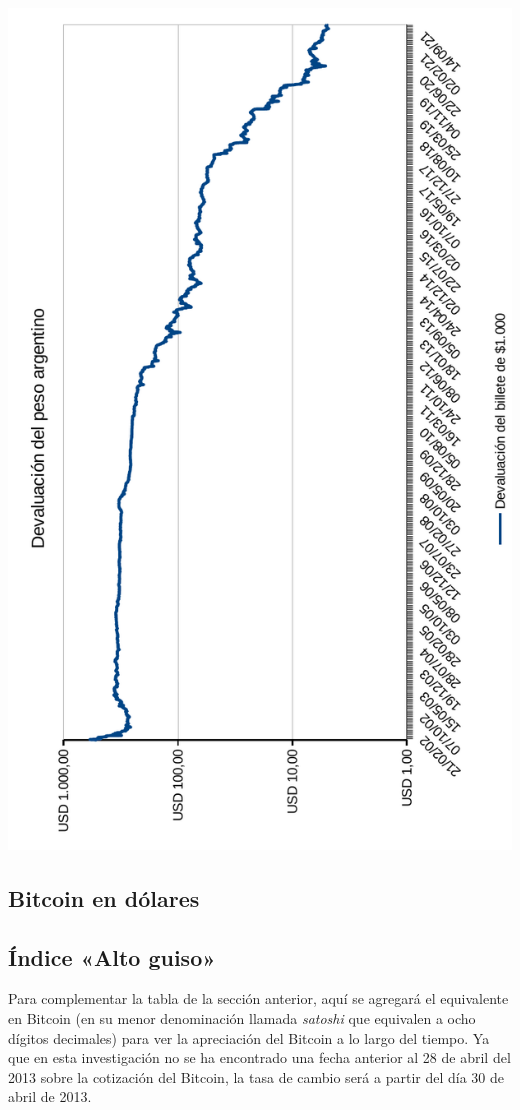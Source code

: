 \documentclass[12pt,a4paper,twoside]{book}
\begin{document}
\newpage

\begin{center}
\includegraphics[scale=0.975,angle=180]{img/deval-peso.pdf}
\end{center}
\newpage

\subsection{Bitcoin en dólares}

\newpage

\subsection{Índice «Alto guiso»}
Para complementar la tabla de la sección anterior, aquí se agregará el equivalente en Bitcoin (en su menor denominación llamada \textit{satoshi} que equivalen a ocho dígitos decimales) para ver la apreciación del Bitcoin a lo largo del tiempo. Ya que en esta investigación no se ha encontrado una fecha anterior al 28 de abril del 2013 sobre la cotización del Bitcoin, la tasa de cambio será a partir del día 30 de abril de 2013.
\end{document}
